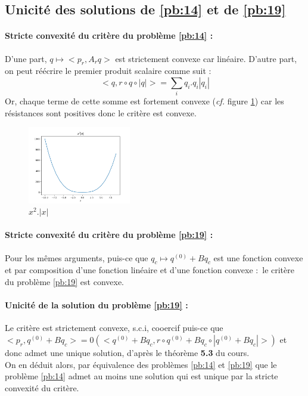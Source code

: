 \documentclass{article}
\begin{document}
    \subsection{Unicité des solutions de \ref{pb:14} et de \ref{pb:19}}

    \paragraph{Stricte convexité du critère du problème \ref{pb:14} :}D'une part, $q \mapsto <p_r, A_rq>$ est strictement convexe car linéaire. D'autre part, on peut réécrire le premier produit scalaire comme suit :
    \[<q, r\circ q \circ|q|> = \sum_i q_i.q_i|q_i|\]
    Or, chaque terme de cette somme est fortement convexe (\textit{cf.} figure \ref{courbe}) car les résistances sont positives donc le critère est convexe.
    \begin{figure}
        \begin{center}
            \includegraphics[width=0.4\textwidth]{courbe.png}
        \end{center}
            \caption{$x^2.|x|$}
            \label{courbe}
    \end{figure}

    \paragraph{Stricte convexité du critère du problème \ref{pb:19} :} Pour les mêmes arguments, puis-ce que $q_c \mapsto q^{(0)} + Bq_c$ est une fonction convexe et par composition d'une fonction linéaire et d'une fonction convexe : le critère du problème \ref{pb:19} est convexe.

    \paragraph{Unicité de la solution du problème \ref{pb:19} :} Le critère est strictement convexe, s.c.i, cooercif puis-ce que $<p_r, q^{(0)} + Bq_c> = 0(<q^{(0)} + Bq_c, r\circ q^{(0)} + Bq_c \circ|q^{(0)} + Bq_c|>)$ et donc admet une unique solution, d'après le théorème \textbf{5.3} du cours.\\
    On en déduit alors, par équivalence des problèmes \ref{pb:14} et \ref{pb:19} que le problème \ref{pb:14} admet au moins une solution qui est unique par la stricte convexité du critère.
\end{document}
